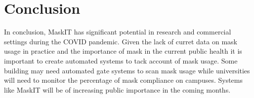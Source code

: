 \documentclass[conference, 12pt, onecolumn]{IEEEtran}
\begin{document}
\section{Conclusion}
In conclusion, MaskIT has significant potential in research and commercial settings during the COVID pandemic. Given the lack of curret data on mask usage in practice and the importance of mask in the current public health it is important to create automated systems to tack account of mask usage. Some building may need automated gate systems to scan mask usage while universities will need to monitor the percentage of mask compliance on campuses. Systems like MaskIT will be of increasing public importance in the coming months. 



\end{document}
